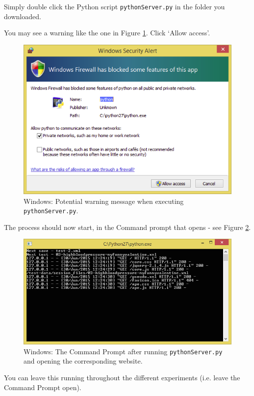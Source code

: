 \documentclass[11pt, oneside]{article}   	%
\begin{document}
			Simply double click the Python script \texttt{pythonServer.py} in the folder you downloaded. 
			
			You may see a warning like the one in Figure \ref{fig:warning}. Click `Allow access'. 
			
			\begin{figure}[htbp]
            \begin{center}
            \includegraphics[width=.6\textwidth]{warning.png}
            \caption{Windows: Potential warning message when executing \texttt{pythonServer.py}.}
            \label{fig:warning}
            \end{center}
            \end{figure}
            
            The process should now start, in the Command prompt that opens - see Figure \ref{fig:python}. 
            
            \begin{figure}[htbp]
            \begin{center}
            \includegraphics[width=.75\textwidth]{python.png}
            \caption{Windows: The Command Prompt after running \texttt{pythonServer.py} and opening the corresponding website.}
            \label{fig:python}
            \end{center}
            \end{figure}
            
            You can leave this running throughout the different experiments (i.e. leave the Command Prompt open). 
\end{document}
